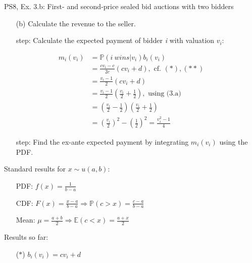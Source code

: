 \begin{frame}{PS8, Ex. 3.b: First- and second-price sealed bid auctions with two bidders}
    \begin{multicols}{2}
      \begin{itemize}
        \item[(b)] Calculate the revenue to the seller.
        \item[\nth{1} step:] Calculate the expected payment of bidder \textit{i} with valuation $v_i$:
      \end{itemize}
      \vspace{-12pt}
      \begin{align*}
        m_i(v_i)&=\mathbb{P}(i\ wins|v_i)b_i(v_i)\\
                &=\frac{cv_i-c}{2c}(cv_i+d),\text{ cf. }(*),(**)\\
                &=\frac{v_i-1}{2}(cv_i+d)\\
                &=\frac{v_i-1}{2}\left(\frac{v_i}{2}+\frac{1}{2}\right),\text{ using (3.a)}\\
                &=\left(\frac{v_i}{2}-\frac{1}{2}\right)\left(\frac{v_i}{2}+\frac{1}{2}\right)\\
                &=\left(\frac{v_i}{2}\right)^2-\left(\frac{1}{2}\right)^2
                 =\frac{v_i^2-1}{4}
      \end{align*}
      \vspace{-18pt}
      \begin{itemize}
        \item[\nth{2} step:] Find the ex-ante expected payment by integrating $m_i(v_i)$ using the PDF.
      \end{itemize}
      \vfill\null\columnbreak
      Standard results for $x\sim u(a, b):$
      \vspace{-6pt}
      \begin{enumerate}
        \item[PDF:] $f(x)=\frac{1}{b-a}$
        \item[CDF:] $F(x)=\frac{x-a}{b-a}\Rightarrow\mathbb{P}(c>x)=\frac{c-a}{b-a}$
        \item[Mean:] $\mu=\frac{a+b}{2}\Rightarrow\mathbb{E}(c<x)=\frac{a+x}{2}$
      \end{enumerate}
      \vspace{-6pt}
      Results so far:
      \vspace{-6pt}
      \begin{itemize}
        \item[($*$)]  $b_i(v_i) = cv_i+d$

\end{itemize}
\end{multicols}
\end{frame}
